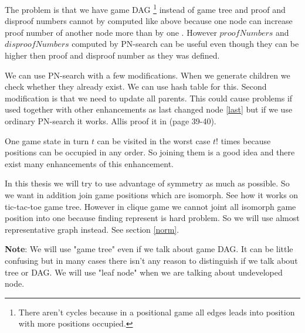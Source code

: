 The problem is that we have game DAG \footnote{There aren't cycles because in a
positional game all edges leads into position with more positions occupied.}
instead of game tree and proof and disproof numbers cannot by computed like
above because one node can increase proof number of another node more than by
one . However $proofNumbers$ and $disproofNumbers$ computed by
PN-search can be useful even though they can be higher then proof and disproof
number as they was defined. 

We can use PN-search with a few modifications. When we generate children we
check whether they already exist. We can use hash table for this. Second
modification is that we need to update all parents. This could cause problems
if used together with other enhancements as last changed node \ref{last} but if
we use ordinary PN-search it works. Allis proof it in \cite{allis} (page
39-40).

One game state in turn $t$ can be visited in the worst case $t!$ times because
positions can be occupied in any order. So joining them is a good idea and
there exist many enhancements of this enhancement.

In this thesis we will try to use advantage of symmetry as much as possible.
So we want in addition join game positions which are isomorph. See 
how it works on tic-tac-toe game tree. However in clique game we cannot joint
all isomorph game position into one because finding 
represent is hard problem. So we will use almost representative graph instead.
See section \ref{norm}.

\textbf{Note}: We will use "game tree" even if we talk about game DAG. It can be little confusing 
but in many cases there isn't any reason to distinguish if we talk about tree or DAG. 
We will use "leaf node" when we are talking about undeveloped node. 

